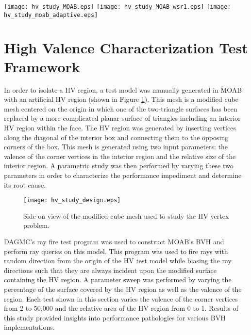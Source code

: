 \begin{sidewaysfigure}
  \centering
  \texttt{[image: hv\_study\_MOAB.eps]}
  \texttt{[image: hv\_study\_MOAB\_wsr1.eps]}
  \texttt{[image: hv\_study\_moab\_adaptive.eps]}
  \caption[High valence study results for various BVH implementations.]{HV characterization study
    results for all MOAB OBB tree implementations. Top Left: Unmodified MOAB
    results. Top Right: Manual modification of MOAB OBB tree's build
    settings. Bottom: Results with adaptive construction for HV regions.}
  \label{fig:moab_hv_studies}
\end{sidewaysfigure}

\section{High Valence Characterization Test Framework}

In order to isolate a HV region, a test model was manually generated in MOAB
with an artificial HV region (shown in Figure \ref{fig:hv_cube_design}). This
mesh is a modified cube mesh centered on the origin in which one of the
two-triangle surfaces has been replaced by a more complicated planar surface of
triangles including an interior HV region within the face. The HV region was
generated by inserting vertices along the diagonal of the interior box and
connecting them to the opposing corners of the box. This mesh is generated using
two input parameters: the valence of the corner vertices in the interior region
and the relative size of the interior region. A parametric study was then
performed by varying these two parameters in order to characterize the
performance impediment and determine its root cause.

\begin{figure}[H]
  \centering
    \texttt{[image: hv\_study\_design.eps]}
    \caption[High valence vertex test model.]{Side-on view of the modified cube
      mesh used to study the HV vertex problem.}
    \label{fig:hv_cube_design}
\end{figure}

DAGMC's ray fire test program was used to construct MOAB's BVH and perform ray
queries on this model. This program was used to fire rays with random
direction from the origin of the HV test model while biasing the ray directions
such that they are always incident upon the modified surface containing the HV
region. A parameter sweep was performed by varying the percentage of the surface
covered by the HV region as well as the valence of the region. Each test shown
in this section varies the valence of the corner vertices from 2 to 50,000 and
the relative area of the HV region from 0 to 1. Results of this study provided
insights into performance pathologies for various BVH implementations.

